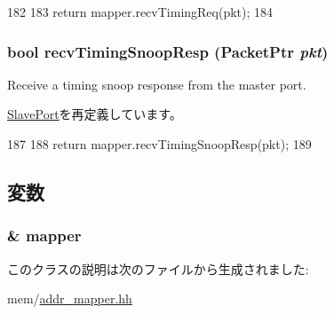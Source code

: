 \begin{DoxyCode}
182         {
183             return mapper.recvTimingReq(pkt);
184         }
\end{DoxyCode}
\hypertarget{classAddrMapper_1_1MapperSlavePort_a9b643d565edc21dac11ce15a560238a7}{
\subsubsection[{recvTimingSnoopResp}]{\setlength{\rightskip}{0pt plus 5cm}bool recvTimingSnoopResp ({\bf PacketPtr} {\em pkt})}}
\label{classAddrMapper_1_1MapperSlavePort_a9b643d565edc21dac11ce15a560238a7}
Receive a timing snoop response from the master port. 

\hyperlink{classSlavePort_ae808ca0180bf333d9072270ed66f17fe}{SlavePort}を再定義しています。


\begin{DoxyCode}
187         {
188             return mapper.recvTimingSnoopResp(pkt);
189         }
\end{DoxyCode}


\subsection{変数}
\hypertarget{classAddrMapper_1_1MapperSlavePort_a85ab1c024f81c47e0a2c4e4261eabfb4}{
\subsubsection[{mapper}]{\& {\bf mapper}}}
\label{classAddrMapper_1_1MapperSlavePort_a85ab1c024f81c47e0a2c4e4261eabfb4}


このクラスの説明は次のファイルから生成されました:\begin{DoxyCompactItemize}
\item 
mem/\hyperlink{addr__mapper_8hh}{addr\_\-mapper.hh}\end{DoxyCompactItemize}
